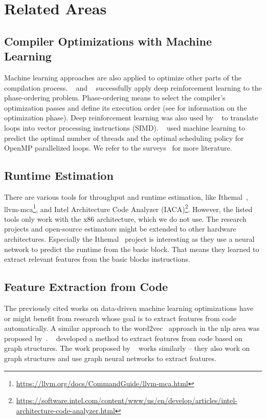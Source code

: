 \section{Related Areas}
\label{sec:rw:other}
\subsection{Compiler Optimizations with Machine Learning}
Machine learning approaches are also applied to optimize other parts of the compilation process.
\citeauthor{mammadli2020static}~\cite{mammadli2020static} and \citeauthor{huang2019autophase}~\cite{huang2019autophase} successfully apply deep reinforcement learning to the phase-ordering problem.
Phase-ordering means to select the compiler's optimization passes and define its execution order (see  for information on the optimization phase).
Deep reinforcement learning was also used by \citeauthor{haj2020neurovectorizer}~\cite{haj2020neurovectorizer} to translate loops into vector processing instructions (SIMD).
\citeauthor{wang2009mapping}~\cite{wang2009mapping} used machine learning to predict the optimal number of threads and the optimal scheduling policy for OpenMP parallelized loops.
We refer to the surveys~\cite{wang2018machine,ashouri2018survey} for more literature.

\subsection{Runtime Estimation}
\label{sec:rw:other:runtime}
There are various tools for throughput and runtime estimation, like Ithemal~\cite{mendis2019ithemal}, llvm-mca\footnote{\url{https://llvm.org/docs/CommandGuide/llvm-mca.html}}, and Intel Architecture Code Analyzer (IACA)\footnote{\url{https://software.intel.com/content/www/us/en/develop/articles/intel-architecture-code-analyzer.html}}.
However, the listed tools only work with the x86 architecture, which we do not use.
The research projects and open-source estimators might be extended to other hardware architectures.
Especially the Ithemal~\cite{mendis2019ithemal} project is interesting as they use a neural network to predict the runtime from the basic block.
That means they learned to extract relevant features from the basic blocks instructions.

\subsection{Feature Extraction from Code}
The previously cited works on data-driven machine learning optimizations have or might benefit from research whose goal is to extract features from code automatically.
A similar approach to the word2vec~\cite{mikolov2013efficient} approach in the \ac{nlp} area was proposed by~\cite{ben2018neural,alon2019code2vec}.
\citeauthor{cummins2021programl}~\cite{cummins2021programl} developed a method to extract features from code based on graph structures.
The work proposed by \citeauthor{brauckmann2020compiler}~\cite{brauckmann2020compiler} works similarly -- they also work on graph structures and use graph neural networks to extract features.


